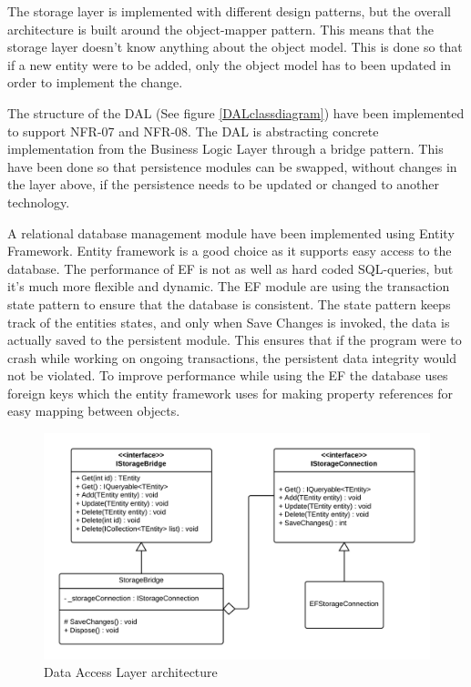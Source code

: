 \documentclass[../report.tex]{subfiles}
\begin{document}
\graphicspath{{img/}{../img/}}

The storage layer is implemented with different design patterns, but the overall architecture is built around the object-mapper pattern. This means that the storage layer doesn't know anything about the object model. This is done so that if a new entity were to be added, only the object model has to been updated in order to implement the change. 


The structure of the DAL (See figure \ref{DALclassdiagram}) have been implemented to support NFR-07 and NFR-08. The DAL is abstracting concrete implementation from the Business Logic Layer through a bridge pattern. This have been done so that persistence modules can be swapped, without changes in the layer above, if the persistence needs to be updated or changed to another technology. 

A relational database management module have been implemented using Entity Framework. Entity framework is a good choice as it supports easy access to the database. The performance of EF is not as well as hard coded SQL-queries, but it's much more flexible and dynamic. The EF module are using the transaction state pattern to ensure that the database is consistent. The state pattern keeps track of the entities states, and only when Save Changes is invoked, the data is actually saved to the persistent module. This ensures that if the program were to crash while working on ongoing transactions, the persistent data integrity would not be violated. To improve performance while using the EF the database uses foreign keys which the entity framework uses for making property references for easy mapping between objects.

\begin{figure}
\centering
\includegraphics[width=\linewidth]{DALclassdiagram.png}
\caption{Data Access Layer architecture}
\label{fig:DALclassdiagram}
\end{figure} 
\end{document}
